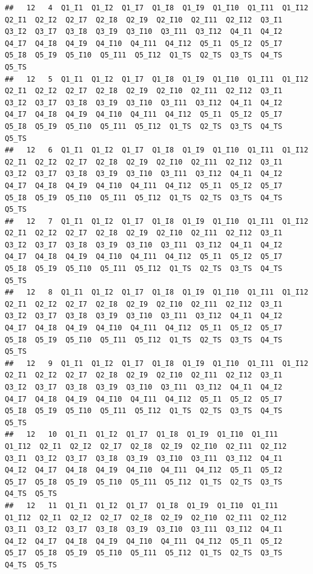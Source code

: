 \documentclass[]{book}
\begin{document}
\begin{verbatim}
##   12   4  Q1_I1  Q1_I2  Q1_I7  Q1_I8  Q1_I9  Q1_I10  Q1_I11  Q1_I12  Q2_I1  Q2_I2  Q2_I7  Q2_I8  Q2_I9  Q2_I10  Q2_I11  Q2_I12  Q3_I1  Q3_I2  Q3_I7  Q3_I8  Q3_I9  Q3_I10  Q3_I11  Q3_I12  Q4_I1  Q4_I2  Q4_I7  Q4_I8  Q4_I9  Q4_I10  Q4_I11  Q4_I12  Q5_I1  Q5_I2  Q5_I7  Q5_I8  Q5_I9  Q5_I10  Q5_I11  Q5_I12  Q1_TS  Q2_TS  Q3_TS  Q4_TS  Q5_TS
##   12   5  Q1_I1  Q1_I2  Q1_I7  Q1_I8  Q1_I9  Q1_I10  Q1_I11  Q1_I12  Q2_I1  Q2_I2  Q2_I7  Q2_I8  Q2_I9  Q2_I10  Q2_I11  Q2_I12  Q3_I1  Q3_I2  Q3_I7  Q3_I8  Q3_I9  Q3_I10  Q3_I11  Q3_I12  Q4_I1  Q4_I2  Q4_I7  Q4_I8  Q4_I9  Q4_I10  Q4_I11  Q4_I12  Q5_I1  Q5_I2  Q5_I7  Q5_I8  Q5_I9  Q5_I10  Q5_I11  Q5_I12  Q1_TS  Q2_TS  Q3_TS  Q4_TS  Q5_TS
##   12   6  Q1_I1  Q1_I2  Q1_I7  Q1_I8  Q1_I9  Q1_I10  Q1_I11  Q1_I12  Q2_I1  Q2_I2  Q2_I7  Q2_I8  Q2_I9  Q2_I10  Q2_I11  Q2_I12  Q3_I1  Q3_I2  Q3_I7  Q3_I8  Q3_I9  Q3_I10  Q3_I11  Q3_I12  Q4_I1  Q4_I2  Q4_I7  Q4_I8  Q4_I9  Q4_I10  Q4_I11  Q4_I12  Q5_I1  Q5_I2  Q5_I7  Q5_I8  Q5_I9  Q5_I10  Q5_I11  Q5_I12  Q1_TS  Q2_TS  Q3_TS  Q4_TS  Q5_TS
##   12   7  Q1_I1  Q1_I2  Q1_I7  Q1_I8  Q1_I9  Q1_I10  Q1_I11  Q1_I12  Q2_I1  Q2_I2  Q2_I7  Q2_I8  Q2_I9  Q2_I10  Q2_I11  Q2_I12  Q3_I1  Q3_I2  Q3_I7  Q3_I8  Q3_I9  Q3_I10  Q3_I11  Q3_I12  Q4_I1  Q4_I2  Q4_I7  Q4_I8  Q4_I9  Q4_I10  Q4_I11  Q4_I12  Q5_I1  Q5_I2  Q5_I7  Q5_I8  Q5_I9  Q5_I10  Q5_I11  Q5_I12  Q1_TS  Q2_TS  Q3_TS  Q4_TS  Q5_TS
##   12   8  Q1_I1  Q1_I2  Q1_I7  Q1_I8  Q1_I9  Q1_I10  Q1_I11  Q1_I12  Q2_I1  Q2_I2  Q2_I7  Q2_I8  Q2_I9  Q2_I10  Q2_I11  Q2_I12  Q3_I1  Q3_I2  Q3_I7  Q3_I8  Q3_I9  Q3_I10  Q3_I11  Q3_I12  Q4_I1  Q4_I2  Q4_I7  Q4_I8  Q4_I9  Q4_I10  Q4_I11  Q4_I12  Q5_I1  Q5_I2  Q5_I7  Q5_I8  Q5_I9  Q5_I10  Q5_I11  Q5_I12  Q1_TS  Q2_TS  Q3_TS  Q4_TS  Q5_TS
##   12   9  Q1_I1  Q1_I2  Q1_I7  Q1_I8  Q1_I9  Q1_I10  Q1_I11  Q1_I12  Q2_I1  Q2_I2  Q2_I7  Q2_I8  Q2_I9  Q2_I10  Q2_I11  Q2_I12  Q3_I1  Q3_I2  Q3_I7  Q3_I8  Q3_I9  Q3_I10  Q3_I11  Q3_I12  Q4_I1  Q4_I2  Q4_I7  Q4_I8  Q4_I9  Q4_I10  Q4_I11  Q4_I12  Q5_I1  Q5_I2  Q5_I7  Q5_I8  Q5_I9  Q5_I10  Q5_I11  Q5_I12  Q1_TS  Q2_TS  Q3_TS  Q4_TS  Q5_TS
##   12   10  Q1_I1  Q1_I2  Q1_I7  Q1_I8  Q1_I9  Q1_I10  Q1_I11  Q1_I12  Q2_I1  Q2_I2  Q2_I7  Q2_I8  Q2_I9  Q2_I10  Q2_I11  Q2_I12  Q3_I1  Q3_I2  Q3_I7  Q3_I8  Q3_I9  Q3_I10  Q3_I11  Q3_I12  Q4_I1  Q4_I2  Q4_I7  Q4_I8  Q4_I9  Q4_I10  Q4_I11  Q4_I12  Q5_I1  Q5_I2  Q5_I7  Q5_I8  Q5_I9  Q5_I10  Q5_I11  Q5_I12  Q1_TS  Q2_TS  Q3_TS  Q4_TS  Q5_TS
##   12   11  Q1_I1  Q1_I2  Q1_I7  Q1_I8  Q1_I9  Q1_I10  Q1_I11  Q1_I12  Q2_I1  Q2_I2  Q2_I7  Q2_I8  Q2_I9  Q2_I10  Q2_I11  Q2_I12  Q3_I1  Q3_I2  Q3_I7  Q3_I8  Q3_I9  Q3_I10  Q3_I11  Q3_I12  Q4_I1  Q4_I2  Q4_I7  Q4_I8  Q4_I9  Q4_I10  Q4_I11  Q4_I12  Q5_I1  Q5_I2  Q5_I7  Q5_I8  Q5_I9  Q5_I10  Q5_I11  Q5_I12  Q1_TS  Q2_TS  Q3_TS  Q4_TS  Q5_TS

\end{verbatim}
\end{document}
